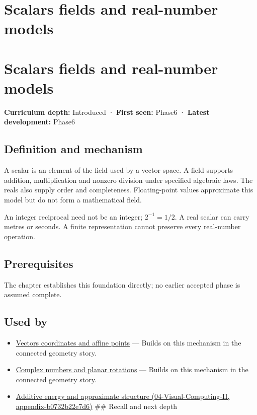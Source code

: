 \hypertarget{appendix-52051ad550fe}{}
\section*{Scalars fields and real-number models}
\section{Scalars fields and real-number models}\label{appendix-52051ad550fe-scalars-fields-and-real-number-models}

\textbf{Curriculum depth:} Introduced · \textbf{First seen:} Phase6 · \textbf{Latest development:} Phase6

\subsection{Definition and mechanism}\label{appendix-52051ad550fe-definition-and-mechanism}

A scalar is an element of the field used by a vector space. A field supports addition, multiplication and nonzero division under specified algebraic laws. The reals also supply order and completeness. Floating-point values approximate this model but do not form a mathematical field.

An integer reciprocal need not be an integer; \(2^{-1}=1/2\). A real scalar can carry metres or seconds. A finite representation cannot preserve every real-number operation.

\subsection{Prerequisites}\label{appendix-52051ad550fe-prerequisites}

The chapter establishes this foundation directly; no earlier accepted phase is assumed complete.

\subsection{Used by}\label{appendix-52051ad550fe-used-by}

\begin{itemize}
\item
  \hyperref[appendix-0659864c0aa3]{Vectors coordinates and affine points} --- Builds on this mechanism in the connected geometry story.
\item
  \hyperref[appendix-f77eadcc4a93]{Complex numbers and planar rotations} --- Builds on this mechanism in the connected geometry story.
\item
  \href{../04-Visual-Computing-II/main.pdf\#nameddest=appendix-b0732b22e7d6}{Additive energy and approximate structure (04-Visual-Computing-II, appendix-b0732b22e7d6)} \#\# Recall and next depth
\end{itemize}

